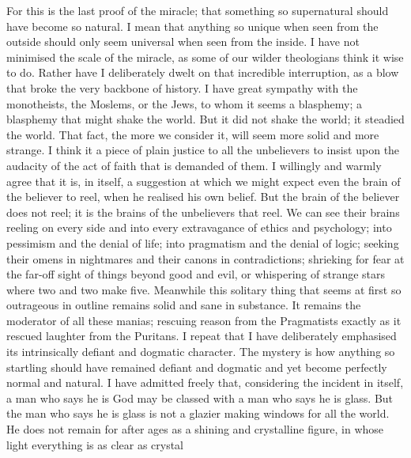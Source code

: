 For this is the last proof of the miracle; that something so supernatural should have become so natural. I mean that anything so unique when seen from the outside should only seem universal when seen from the inside. I have not minimised the scale of the miracle, as some of our wilder theologians think it wise to do. Rather have I deliberately dwelt on that incredible interruption, as a blow that broke the very backbone of history. I have great sympathy with the monotheists, the Moslems, or the Jews, to whom it seems a blasphemy; a blasphemy that might shake the world. But it did not shake the world; it steadied the world. That fact, the more we consider it, will seem more solid and more strange. I think it a piece of plain justice to all the unbelievers to insist upon the audacity of the act of faith that is demanded of them. I willingly and warmly agree that it is, in itself, a suggestion at which we might expect even the brain of the believer to reel, when he realised his own belief. But the brain of the believer does not reel; it is the brains of the unbelievers that reel. We can see their brains reeling on every side and into every extravagance of ethics and psychology; into pessimism and the denial of life; into pragmatism and the denial of logic; seeking their omens in nightmares and their canons in contradictions; shrieking for fear at the far-off sight of things beyond good and evil, or whispering of strange stars where two and two make five. Meanwhile this solitary thing that seems at first so outrageous in outline remains solid and sane in substance. It remains the moderator of all these manias; rescuing reason from the Pragmatists exactly as it rescued laughter from the Puritans. I repeat that I have deliberately emphasised its intrinsically defiant and dogmatic character. The mystery is how anything so startling should have remained defiant and dogmatic and yet become perfectly normal and natural. I have admitted freely that, considering the incident in itself, a man who says he is God may be classed with a man who says he is glass. But the man who says he is glass is not a glazier making windows for all the world. He does not remain for after ages as a shining and crystalline figure, in whose light everything is as clear as crystal

